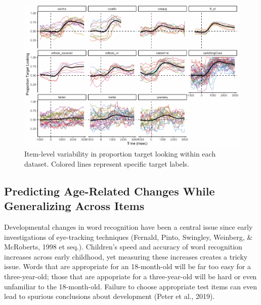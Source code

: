 \documentclass[10pt, letterpaper]{article}
\newenvironment{CodeChunk}{}{}
\begin{document}
\begin{CodeChunk}
\begin{figure}[h]

{\centering \includegraphics{figs/peekbank_item_vis-1} 

}

\caption[Item-level variability in proportion target looking within each dataset]{Item-level variability in proportion target looking within each dataset. Colored lines represent specific target labels.}\label{fig:peekbank_item_vis}
\end{figure}
\end{CodeChunk}

\hypertarget{predicting-age-related-changes-while-generalizing-across-items}{%
\subsection{Predicting Age-Related Changes While Generalizing Across
Items}\label{predicting-age-related-changes-while-generalizing-across-items}}

Developmental changes in word recognition have been a central issue
since early investigations of eye-tracking techniques (Fernald, Pinto,
Swingley, Weinberg, \& McRoberts, 1998 et seq.). Children's speed and
accuracy of word recognition increases across early childhood, yet
measuring these increases creates a tricky issue. Words that are
appropriate for an 18-month-old will be far too easy for a
three-year-old; those that are appopriate for a three-year-old will be
hard or even unfamiliar to the 18-month-old. Failure to choose
appropriate test items can even lead to spurious conclusions about
development (Peter et al., 2019).
\end{document}
